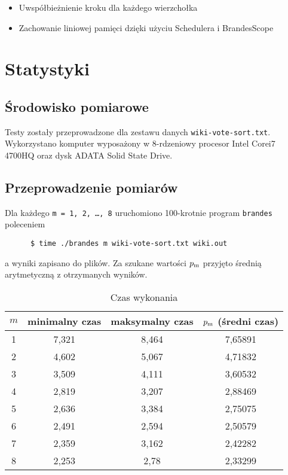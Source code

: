 \documentclass{article}
\begin{document}
      \begin{itemize}[noitemsep]
      \item Uwspółbieżnienie kroku dla każdego wierzchołka
      \item Zachowanie liniowej pamięci dzięki użyciu Schedulera i BrandesScope
      \end{itemize}

  \newpage
  \section{Statystyki}
    \subsection{Środowisko pomiarowe}
    Testy zostały przeprowadzone dla zestawu danych \texttt{wiki-vote-sort.txt}.
    Wykorzystano komputer wyposażony w 8-rdzeniowy procesor Intel\textsuperscript{
    \textregistered} Core\texttrademark i7 4700HQ oraz dysk ADATA\textsuperscript{
    \textregistered} Solid State Drive.
    \subsection{Przeprowadzenie pomiarów}
    Dla każdego \texttt{m = 1, 2, \ldots, 8} uruchomiono 100-krotnie program
    \texttt{brandes} poleceniem
    \begin{verbatim}
      $ time ./brandes m wiki-vote-sort.txt wiki.out
    \end{verbatim}
    \vspace{-3ex}
    a wyniki zapisano do plików. Za szukane wartości $p\textsubscript{m}$ przyjęto
    średnią arytmetyczną z otrzymanych wyników.
    \begin{table}[h]
      \centering
      \label{tab:times}
      \begin{tabular}{|c|c|c|c|}
        \hline
        \bfseries $m$ & \bfseries minimalny czas & \bfseries maksymalny czas & \bfseries $p\textsubscript{m}$ (średni czas)\\
        \hline
        1 & 7,321     & 8,464      & 7,65891 \\
        2 & 4,602     & 5,067      & 4,71832 \\
        3 & 3,509     & 4,111      & 3,60532 \\
        4 & 2,819     & 3,207      & 2,88469 \\
        5 & 2,636     & 3,384      & 2,75075 \\
        6 & 2,491     & 2,594      & 2,50579 \\
        7 & 2,359     & 3,162      & 2,42282 \\
        8 & 2,253     & 2,78       & 2,33299 \\
        \hline
        \end{tabular}
      \caption{Czas wykonania}
    \end{table}
\end{document}
